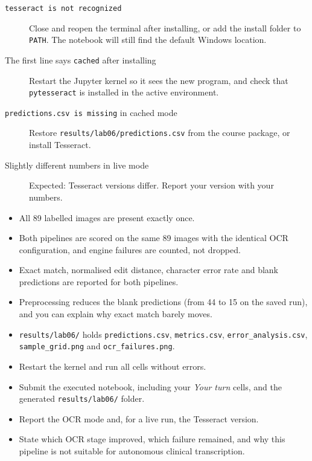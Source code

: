 \begin{troubleshoot}
\begin{description}
  \item[\texttt{tesseract is not recognized}] Close and reopen the terminal after installing, or add the install folder to \texttt{PATH}. The notebook will still find the default Windows location.
  \item[The first line says \texttt{cached} after installing] Restart the Jupyter kernel so it sees the new program, and check that \texttt{pytesseract} is installed in the active environment.
  \item[\texttt{predictions.csv is missing} in cached mode] Restore \texttt{results/lab06/predictions.csv} from the course package, or install Tesseract.
  \item[Slightly different numbers in live mode] Expected: Tesseract versions differ. Report your version with your numbers.
\end{description}
\end{troubleshoot}

\begin{verification}
\begin{itemize}
  \item All 89 labelled images are present exactly once.
  \item Both pipelines are scored on the same 89 images with the identical OCR configuration, and engine failures are counted, not dropped.
  \item Exact match, normalised edit distance, character error rate and blank predictions are reported for both pipelines.
  \item Preprocessing reduces the blank predictions (from 44 to 15 on the saved run), and you can explain why exact match barely moves.
  \item \texttt{results/lab06/} holds \texttt{predictions.csv}, \texttt{metrics.csv}, \texttt{error\_analysis.csv}, \texttt{sample\_grid.png} and \texttt{ocr\_failures.png}.
\end{itemize}
\end{verification}

\begin{labdeliverable}
\begin{itemize}
  \item Restart the kernel and run all cells without errors.
  \item Submit the executed notebook, including your \emph{Your turn} cells, and the generated \texttt{results/lab06/} folder.
  \item Report the OCR mode and, for a live run, the Tesseract version.
  \item State which OCR stage improved, which failure remained, and why this pipeline is not suitable for autonomous clinical transcription.
\end{itemize}
\end{labdeliverable}
